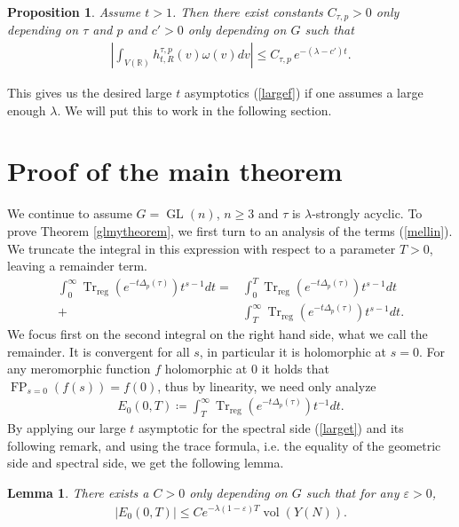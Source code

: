 \documentclass[11pt,reqno]{amsart}
\numberwithin{equation}{section}
\newtheorem{lem}[thm]{Lemma}
\newtheorem{prop}[thm]{Proposition}
\theoremstyle{definition}
\theoremstyle{remark}
\newcommand{\GL}{\operatorname{GL}}
\newcommand{\Trreg}{\operatorname{Tr}_{\operatorname{reg}}}
\newcommand{\vol}{\operatorname{vol}}
\newcommand{\FP}{\operatorname{FP}}
\newcommand{\R}{\mathbb{R}}
\renewcommand{\epsilon}{\varepsilon}
\begin{document}
\begin{prop}\label{orbitasymp}
    Assume $t> 1$. Then there exist constants $C_{\tau,p}>0$ only depending on $\tau$ and $p$ and $c'>0$ only depending on $G$ such that
    \begin{align*}
        \left\vert\int_{V(\R)}h^{\tau,p}_{t,R}(v)\omega(v)dv\right\vert \leq C_{\tau,p} \,e^{-(\lambda-c') t}.
    \end{align*}
\end{prop}
\noindent This gives us the desired large $t$ asymptotics (\ref{largef}) if one assumes a large enough $\lambda$. We will put this to work in the following section.


\bigskip

\section{Proof of the main theorem}\label{conclusion}

\noindent We continue to assume $G=\GL(n)$, $n\geq 3$ and $\tau$ is $\lambda$-strongly acyclic. To prove Theorem \ref{glmytheorem}, we first turn to an analysis of the terms (\ref{mellin}). We truncate the integral in this expression with respect to a parameter $T>0$, leaving a remainder term.
\begin{align}\label{trunc}
    \int_0^\infty \Trreg(e^{-t\Delta_p(\tau)})t^{s-1}dt = &\int_0^T \Trreg(e^{-t\Delta_p(\tau)})t^{s-1}dt \\
    + &\int_T^\infty \Trreg(e^{-t\Delta_p(\tau)})t^{s-1}dt.
\end{align}
We focus first on the second integral on the right hand side, what we call the remainder. It is convergent for all $s$, in particular it is holomorphic at $s=0$. For any meromorphic function $f$ holomorphic at $0$ it holds that $\FP_{s=0}(f(s))=f(0)$, thus by linearity, we need only analyze
\begin{align*}
    E_0(0,T)\coloneqq \int_T^\infty \Trreg(e^{-t\Delta_p(\tau)})t^{-1}dt.
\end{align*}
By applying our large $t$ asymptotic for the spectral side (\ref{larget}) and its following remark, and using the trace formula, i.e. the equality of the geometric side and spectral side, we get the following lemma.

\begin{lem}\label{error0}
There exists a $C>0$ only depending on $G$ such that for any $\epsilon>0$,
    \begin{align*}
    \vert E_0(0,T)\vert\leq Ce^{-\lambda(1-\epsilon)T}\vol(Y(N)).
\end{align*}
\end{lem}
\end{document}
